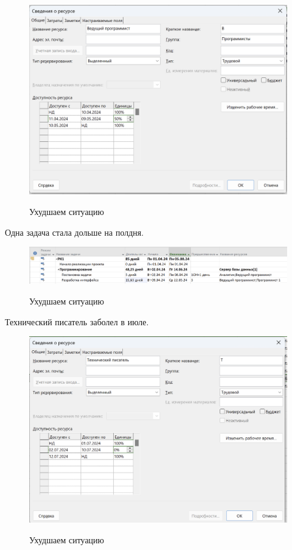 \begin{figure}[ht!]
	\includegraphics[width=0.75\linewidth]{assets/images/10.4-vedush.png}
	\label{fig:r2}
	\caption{Ухудшаем ситуацию}
\end{figure}
\FloatBarrier

Одна задача стала дольше на полдня.

\begin{figure}[ht!]
	\includegraphics[width=0.75\linewidth]{assets/images/10.4.2-vedush.png}
	\label{fig:r2}
	\caption{Ухудшаем ситуацию}
\end{figure}
\FloatBarrier

Технический писатель заболел в июле.

\begin{figure}[ht!]
	\includegraphics[width=0.75\linewidth]{assets/images/10.5.1-pisaka.png}
	\label{fig:r2}
	\caption{Ухудшаем ситуацию}
\end{figure}
\FloatBarrier

